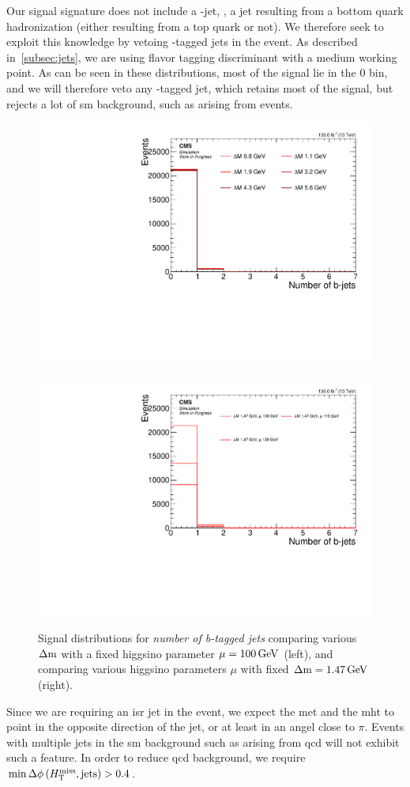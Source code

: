 Our signal signature does not include a \PQb-jet, \ie, a jet resulting from a bottom quark hadronization (either resulting from a top quark or not). We therefore seek to exploit this knowledge by vetoing \PQb-tagged jets in the event. As described in~\ref{subsec:jets}, we are using \DEEPCSV flavor tagging discriminant with a medium working point. As can be seen in these distributions, most of the signal lie in the 0 bin, and we will therefore veto any \PQb-tagged jet, which retains most of the signal, but rejects a lot of \gls{sm} background, such as arising from \ttbar events. 

\begin{figure}[!htb]
\centering
\includegraphics[width=0.48\linewidth]{plots/signal_common_distributions_fixed_mu/none_BTagsDeepMedium.pdf} \,
\includegraphics[width=0.48\linewidth]{plots/signal_common_distributions_fixed_dm/none_BTagsDeepMedium.pdf}  \\
\caption[Signal \emph{number of b-tagged jets} distributions]{ Signal distributions for \emph{number of b-tagged jets} comparing various $\Delta\mathrm{m}$ with a fixed higgsino parameter $\mu=100\,\text{Ge\hspace{-.08em}V}$ (left), and comparing various higgsino parameters $\mu$ with fixed $\Delta\mathrm{m}=1.47\,\text{Ge\hspace{-.08em}V}$ (right).}
\label{fig:signal-bjets}
\end{figure}

Since we are requiring an \gls{isr} jet in the event, we expect the \gls{met} and the \gls{mht} to point in the opposite direction of the jet, or at least in an angel close to $\pi$. Events with multiple jets in the \gls{sm} background such as arising from \gls{qcd} will not exhibit such a feature. In order to reduce \gls{qcd} background, we require $\min{\Delta\phi\left(\ensuremath{H_{\mathrm{T}}^{\text{miss}}},\mathrm{jets}\right)} > 0.4$.

